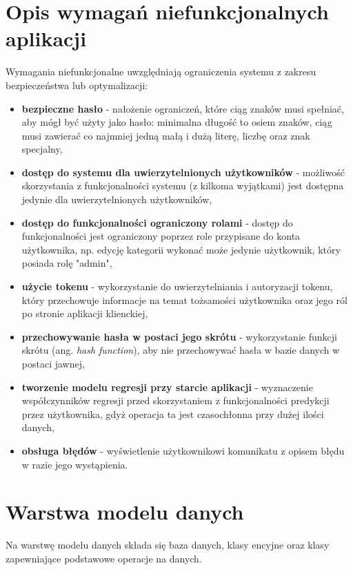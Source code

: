 \section{Opis wymagań niefunkcjonalnych aplikacji}
Wymagania niefunkcjonalne uwzględniają ograniczenia systemu z zakresu bezpieczeństwa lub optymalizacji:
\begin{itemize}
	\item\textbf{bezpieczne hasło} - nałożenie ograniczeń, które ciąg znaków musi spełniać, aby mógł być użyty jako hasło: minimalna długość to osiem znaków, ciąg musi zawierać co najmniej jedną małą i dużą literę, liczbę oraz znak specjalny,
	\item\textbf{dostęp do systemu dla uwierzytelnionych użytkowników} - możliwość skorzystania z funkcjonalności systemu (z kilkoma wyjątkami) jest dostępna jedynie dla uwierzytelnionych użytkowników,
	\item\textbf{dostęp do funkcjonalności ograniczony rolami} - dostęp do funkcjonalności jest ograniczony poprzez role przypisane do konta użytkownika, np. edycję kategorii wykonać może jedynie użytkownik, który posiada rolę "admin",
	\item\textbf{użycie tokenu} - wykorzystanie do uwierzytelniania i autoryzacji tokenu, który przechowuje informacje na temat tożsamości użytkownika oraz jego ról po stronie aplikacji klienckiej,
	\item\textbf{przechowywanie hasła w postaci jego skrótu} - wykorzystanie funkcji skrótu (ang. \textit{hash function}), aby nie przechowywać hasła w bazie danych w postaci jawnej,
	\item\textbf{tworzenie modelu regresji przy starcie aplikacji} - wyznaczenie współczynników regresji przed skorzystaniem z funkcjonalności predykcji przez użytkownika, gdyż operacja ta jest czasochłonna przy dużej ilości danych,
	\item\textbf{obsługa błędów} - wyświetlenie użytkownikowi komunikatu z opisem błędu w razie jego wystąpienia.
\end{itemize}
\section{Warstwa modelu danych}
Na warstwę modelu danych składa się baza danych, klasy encyjne oraz klasy zapewniające podstawowe operacje na danych.

